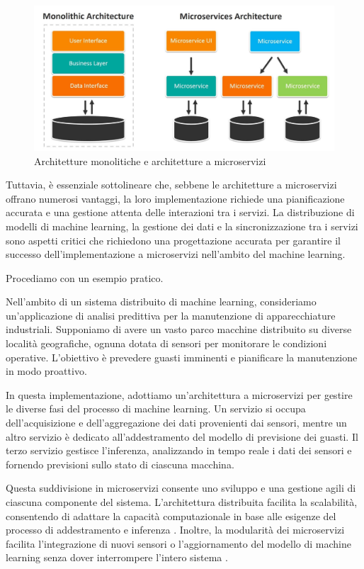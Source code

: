 \begin{figure}[h]
    \centering
    \includegraphics[width=\linewidth]{figures/ch3/micro.jpg}
    \caption[Architetture monolitiche e architetture a microservizi]{Architetture monolitiche e architetture a microservizi}
    \label{fig:cha3:microserivces}
\end{figure}

Tuttavia, è essenziale sottolineare che, sebbene le architetture a microservizi offrano numerosi vantaggi, la loro implementazione richiede una pianificazione accurata e una gestione attenta delle interazioni tra i servizi. La distribuzione di modelli di machine learning, la gestione dei dati e la sincronizzazione tra i servizi sono aspetti critici che richiedono una progettazione accurata per garantire il successo dell'implementazione a microservizi nell'ambito del machine learning.

Procediamo con un esempio pratico.

Nell'ambito di un sistema distribuito di machine learning, consideriamo un'applicazione di analisi predittiva per la manutenzione di apparecchiature industriali. Supponiamo di avere un vasto parco macchine distribuito su diverse località geografiche, ognuna dotata di sensori per monitorare le condizioni operative. L'obiettivo è prevedere guasti imminenti e pianificare la manutenzione in modo proattivo.

In questa implementazione, adottiamo un'architettura a microservizi per gestire le diverse fasi del processo di machine learning. Un servizio si occupa dell'acquisizione e dell'aggregazione dei dati provenienti dai sensori, mentre un altro servizio è dedicato all'addestramento del modello di previsione dei guasti. Il terzo servizio gestisce l'inferenza, analizzando in tempo reale i dati dei sensori e fornendo previsioni sullo stato di ciascuna macchina.

Questa suddivisione in microservizi consente uno sviluppo e una gestione agili di ciascuna componente del sistema. L'architettura distribuita facilita la scalabilità, consentendo di adattare la capacità computazionale in base alle esigenze del processo di addestramento e inferenza \cite{liu2015survey}. Inoltre, la modularità dei microservizi facilita l'integrazione di nuovi sensori o l'aggiornamento del modello di machine learning senza dover interrompere l'intero sistema \cite{yang2018microservices}.

